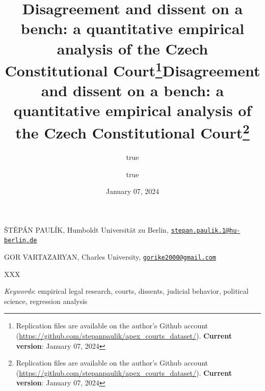 \documentclass[
  11pt,
]{article}
\title{Disagreement and dissent on a bench: a quantitative empirical
analysis of the Czech Constitutional Court\thanks{Replication files are
available on the author's Github account
(\url{https://github.com/stepanpaulik/apex_courts_dataset/}).
\textbf{Current version}: January 07, 2024}}
\author{true \and true}
\date{January 07, 2024}
\title{Disagreement and dissent on a bench: a quantitative empirical
analysis of the Czech Constitutional Court\thanks{Replication files are
available on the author's Github account
(\url{https://github.com/stepanpaulik/apex_courts_dataset/}).
\textbf{Current version}: January 07, 2024}  }
\date{}
\renewenvironment{abstract}
 {{%
    \setlength{\leftmargin}{0mm}
    \setlength{\rightmargin}{\leftmargin}%
  }%
  \relax}
 {\endlist}
\begin{document}



{%
\setlength{\parindent}{0pt}
\thispagestyle{plain}
{%
\maketitle  %

}




{
   \vskip 13.5pt\relax \normalsize\fontsize{11}{12}
   \MakeUppercase{Štěpán Paulík}, \small{Humboldt Universität zu Berlin,
\href{mailto:stepan.paulik.1@hu-berlin.de}{\nolinkurl{stepan.paulik.1@hu-berlin.de}}}   \par \vskip -3.5pt \MakeUppercase{Gor
Vartazaryan}, \small{Charles University,
\href{mailto:gorike2000@gmail.com}{\nolinkurl{gorike2000@gmail.com}}}   

}

}








\begin{abstract}


    \vskip 8.5pt %

\noindent \small{XXX}


\vskip 8.5pt \noindent \emph{Keywords}: empirical legal research,
courts, dissents, judicial behavior, political science, regression
analysis \par




\end{abstract}


\vskip -8.5pt

{
\hypersetup{linkcolor=black}
\setcounter{tocdepth}{2}
\tableofcontents
}


{
\setcounter{tocdepth}{2}
\tableofcontents
}

\setlength{\parindent}{16pt}
\setlength{\parskip}{0pt}
\end{document}
